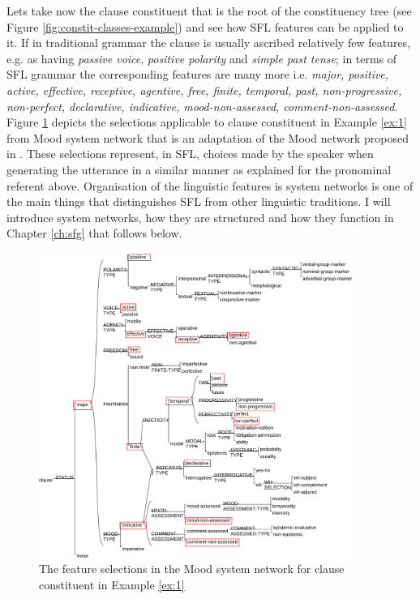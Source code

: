 Lets take now the clause constituent that is the root of the constituency tree (see Figure \ref{fig:constit-classes-example}) and see how SFL features can be applied to it. If in traditional grammar the clause is usually ascribed relatively few features, e.g. as having \textit{passive voice}, \textit{positive polarity} and \textit{simple past tense}; in terms of SFL grammar the corresponding features are many more i.e. \textit{major, positive, active, effective, receptive, agentive, free, finite, temporal, past, non-progressive, non-perfect, declarative, indicative, mood-non-assessed, comment-non-assessed}. Figure \ref{fig:mood-selections} depicts the selections applicable to clause constituent in Example \ref{ex:1} from Mood system network that is an adaptation of the Mood network proposed in \citet[162]{Halliday2013}. These selections represent, in SFL, choices made by the speaker when generating the utterance in a similar manner as explained for the pronominal referent above. Organisation of the linguistic features is system networks is one of the main things that distinguishes SFL from other linguistic traditions. I will introduce system networks, how they are structured and how they function in Chapter \ref{ch:sfg} that follows below. 

\begin{figure}[!ht]
    \centering      
    \includegraphics[width=0.91\textwidth]{Figures/Example/mood-selections.pdf}      
    \caption{The feature selections in the Mood system network for clause constituent in Example \ref{ex:1}}
    \label{fig:mood-selections}
\end{figure}

